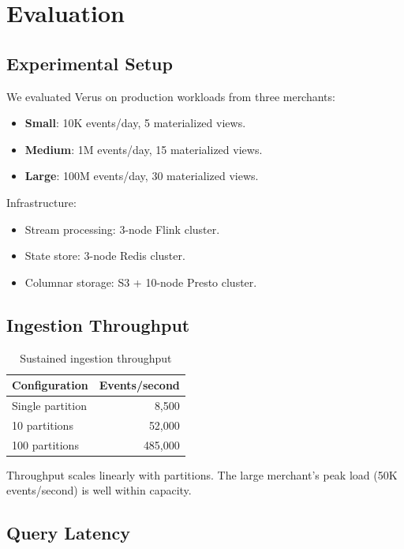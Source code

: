 \section{Evaluation}


\subsection{Experimental Setup}

We evaluated Verus on production workloads from three merchants:

\begin{itemize}
\item \textbf{Small}: 10K events/day, 5 materialized views.
\item \textbf{Medium}: 1M events/day, 15 materialized views.
\item \textbf{Large}: 100M events/day, 30 materialized views.
\end{itemize}

Infrastructure:
\begin{itemize}
\item Stream processing: 3-node Flink cluster.
\item State store: 3-node Redis cluster.
\item Columnar storage: S3 + 10-node Presto cluster.
\end{itemize}

\subsection{Ingestion Throughput}

\begin{table}[h]
\centering
\caption{Sustained ingestion throughput}
\label{tab:throughput}
\begin{tabular}{lr}
\hline
Configuration & Events/second \\
\hline
Single partition & 8,500 \\
10 partitions & 52,000 \\
100 partitions & 485,000 \\
\hline
\end{tabular}
\end{table}

Throughput scales linearly with partitions. The large merchant's peak load (50K events/second) is well within capacity.

\subsection{Query Latency}

